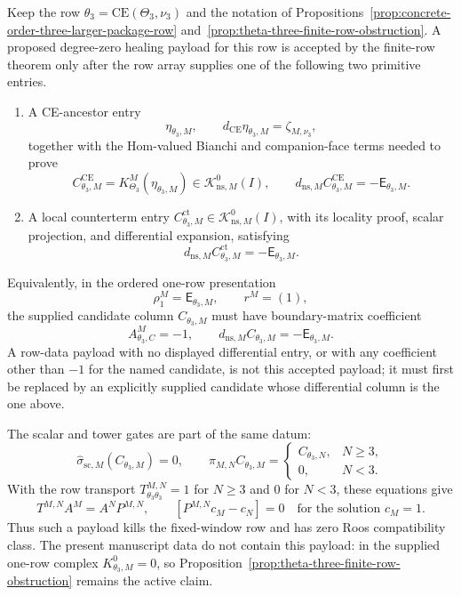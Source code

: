 \begin{prop}\label{prop:theta-three-payload-acceptance-gate}
  Keep the row \(\theta_3=\mathrm{CE}(\Theta_3,\nu_3)\) and the notation of
  Propositions~\ref{prop:concrete-order-three-larger-package-row}
  and~\ref{prop:theta-three-finite-row-obstruction}.  A proposed
  degree-zero healing payload for this row is accepted by the finite-row
  theorem only after the row array supplies one of the following two
  primitive entries.
  \begin{enumerate}[label=(P\arabic*)]
    \item A CE-ancestor entry
      \[
        \eta_{\theta_3,M},\qquad
        d_{\mathrm{CE}}\eta_{\theta_3,M}=\zeta_{M,\nu_3},
      \]
      together with the Hom-valued Bianchi and companion-face terms needed
      to prove
      \[
        C^{\mathrm{CE}}_{\theta_3,M}
          =
        K^M_{\Theta_3}(\eta_{\theta_3,M})
        \in\mathcal K^0_{\mathrm{ns},M}(I),
        \qquad
        d_{\mathrm{ns},M}C^{\mathrm{CE}}_{\theta_3,M}
          =
        -\mathsf E_{\theta_3,M}.
      \]

    \item A local counterterm entry
      \(C^{\mathrm{ct}}_{\theta_3,M}\in
      \mathcal K^0_{\mathrm{ns},M}(I)\), with its locality proof, scalar
      projection, and differential expansion, satisfying
      \[
        d_{\mathrm{ns},M}C^{\mathrm{ct}}_{\theta_3,M}
          =
        -\mathsf E_{\theta_3,M}.
      \]
  \end{enumerate}
  Equivalently, in the ordered one-row presentation
  \[
    \rho^M_1=\mathsf E_{\theta_3,M},\qquad r^M=(1),
  \]
  the supplied candidate column \(C_{\theta_3,M}\) must have boundary-matrix
  coefficient
  \[
    A^M_{\theta_3,C}=-1,
    \qquad
    d_{\mathrm{ns},M}C_{\theta_3,M}
      =
    -\mathsf E_{\theta_3,M}.
  \]
  A row-data payload with no displayed differential entry, or with any
  coefficient other than \(-1\) for the named candidate, is not this
  accepted payload; it must first be replaced by an explicitly supplied
  candidate whose differential column is the one above.

  The scalar and tower gates are part of the same datum:
  \[
    \widehat\sigma_{\mathrm{sc},M}(C_{\theta_3,M})=0,
    \qquad
    \pi_{M,N}C_{\theta_3,M}=
    \begin{cases}
      C_{\theta_3,N}, & N\geq3,\\
      0, & N<3.
    \end{cases}
  \]
  With the row transport
  \(T^{M,N}_{\theta_3\theta_3}=1\) for \(N\geq3\) and \(0\) for
  \(N<3\), these equations give
  \[
    T^{M,N}A^M=A^N P^{M,N},
    \qquad
    [P^{M,N}c_M-c_N]=0
    \quad\text{for the solution }c_M=1.
  \]
  Thus such a payload kills the fixed-window row and has zero Roos
  compatibility class.  The present manuscript data do not contain this
  payload: in the supplied one-row complex \(K^0_{\theta_3,M}=0\), so
  Proposition~\ref{prop:theta-three-finite-row-obstruction} remains the
  active claim.


\end{prop}
